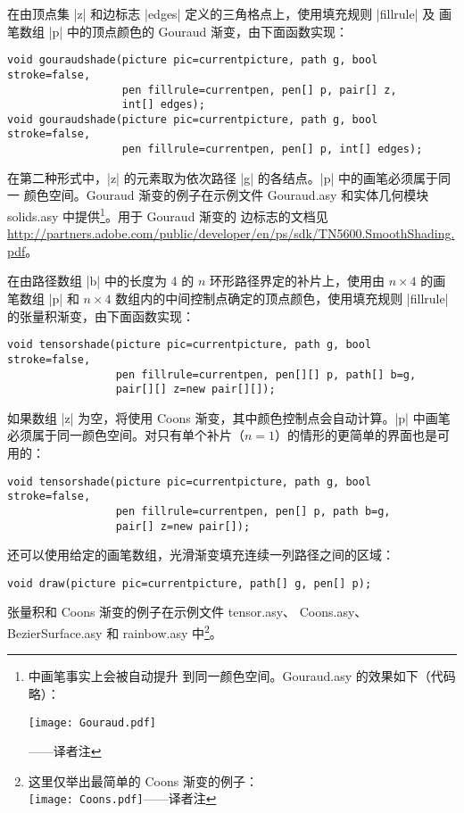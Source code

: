 \documentclass[nofonts,CJKnormalspaces]{ctexbook}[2009/05/20]
\newcommand*\prgname[1]{\textsf{#1}}
\newcommand\transnote[1]{\footnote{#1——译者注}}
\begin{document}
在由顶点集 |z| 和边标志 |edges| 定义的三角格点上，使用填充规则 |fillrule| 及
画笔数组 |p| 中的顶点颜色的 Gouraud 渐变，由下面函数实现：
\begin{lstlisting}
void gouraudshade(picture pic=currentpicture, path g, bool stroke=false,
                  pen fillrule=currentpen, pen[] p, pair[] z,
                  int[] edges);
void gouraudshade(picture pic=currentpicture, path g, bool stroke=false,
                  pen fillrule=currentpen, pen[] p, int[] edges);
\end{lstlisting}
在第二种形式中，|z| 的元素取为依次路径 |g| 的各结点。|p| 中的画笔必须属于同一
颜色空间。Gouraud 渐变的例子在示例文件 \prgname{Gouraud.asy} 和实体几何模块
\prgname{solids.asy} 中提供\transnote{ 中画笔事实上会被自动提升
到同一颜色空间。\prgname{Gouraud.asy} 的效果如下（代码略）：\\
\centerline{\texttt{[image: Gouraud.pdf]}}}。用于 Gouraud 渐变的
边标志的文档见
\url{http://partners.adobe.com/public/developer/en/ps/sdk/TN5600.SmoothShading.pdf}。

在由路径数组 |b| 中的长度为 4 的 $n$ 环形路径界定的补片上，使用由 $n\times4$
的画笔数组 |p| 和 $n\times4$ 数组内的中间控制点确定的顶点颜色，使用填充规则
|fillrule| 的张量积渐变，由下面函数实现：
\begin{lstlisting}
void tensorshade(picture pic=currentpicture, path g, bool stroke=false,
                 pen fillrule=currentpen, pen[][] p, path[] b=g,
                 pair[][] z=new pair[][]);
\end{lstlisting}
如果数组 |z| 为空，将使用 Coons 渐变，其中颜色控制点会自动计算。|p| 中画笔
必须属于同一颜色空间。对只有单个补片（$n=1$）的情形的更简单的界面也是可用的：
\begin{lstlisting}
void tensorshade(picture pic=currentpicture, path g, bool stroke=false,
                 pen fillrule=currentpen, pen[] p, path b=g,
                 pair[] z=new pair[]);
\end{lstlisting}
还可以使用给定的画笔数组，光滑渐变填充连续一列路径之间的区域：
\begin{lstlisting}
void draw(picture pic=currentpicture, path[] g, pen[] p);
\end{lstlisting}
张量积和 Coons 渐变的例子在示例文件 \prgname{tensor.asy}、
\prgname{Coons.asy}、\prgname{BezierSurface.asy} 和 \prgname{rainbow.asy}
中\transnote{这里仅举出最简单的 Coons 渐变的例子：\\
\vbox{}%
\texttt{[image: Coons.pdf]}\box0}。
\end{document}
